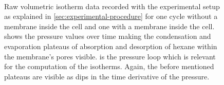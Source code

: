 \documentclass[../thesis.tex]{subfiles}
\begin{document}
        \begin{figure}[htp]
            \centering
            \\
            \caption{Raw volumetric isotherm data recorded with the experimental setup as explained in \cref{sec:experimental-procedure} for one cycle without a membrane inside the cell and one with a membrane inside the cell. \protect{} shows the pressure values over time making the condensation and evaporation plateaus of absorption and desorption of hexane within the membrane's pores visible. \protect{} is the pressure loop which is relevant for the computation of the isotherms. Again, the before mentioned plateaus are visible as dips in the time derivative of the pressure. }
            \label{fig:raw-isotherms}
        \end{figure}
\end{document}
